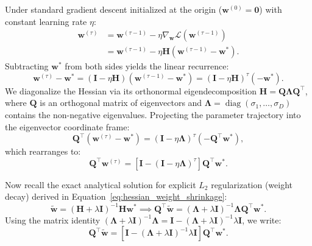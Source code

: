 Under standard gradient descent initialized at the origin ($\mathbf{w}^{(0)} = \mathbf{0}$) with constant learning rate $\eta$:
\begin{align}
\mathbf{w}^{(\tau)} &= \mathbf{w}^{(\tau-1)} - \eta \nabla_{\mathbf{w}} \mathcal{L}(\mathbf{w}^{(\tau-1)}) \nonumber \\
&= \mathbf{w}^{(\tau-1)} - \eta \mathbf{H} (\mathbf{w}^{(\tau-1)} - \mathbf{w}^*).
\end{align}
Subtracting $\mathbf{w}^*$ from both sides yields the linear recurrence:
\begin{equation}
\mathbf{w}^{(\tau)} - \mathbf{w}^* = (\mathbf{I} - \eta \mathbf{H}) (\mathbf{w}^{(\tau-1)} - \mathbf{w}^*) = (\mathbf{I} - \eta \mathbf{H})^\tau (-\mathbf{w}^*).
\label{eq:grad_descent_recurrence_hessian}
\end{equation}
We diagonalize the Hessian via its orthonormal eigendecomposition $\mathbf{H} = \mathbf{Q} \boldsymbol{\Lambda} \mathbf{Q}^\top$, where $\mathbf{Q}$ is an orthogonal matrix of eigenvectors and $\boldsymbol{\Lambda} = \operatorname{diag}(\sigma_1, \dots, \sigma_D)$ contains the non-negative eigenvalues. Projecting the parameter trajectory into the eigenvector coordinate frame:
\begin{equation}
\mathbf{Q}^\top (\mathbf{w}^{(\tau)} - \mathbf{w}^*) = (\mathbf{I} - \eta \boldsymbol{\Lambda})^\tau (-\mathbf{Q}^\top \mathbf{w}^*),
\end{equation}
which rearranges to:
\begin{equation}
\mathbf{Q}^\top \mathbf{w}^{(\tau)} = \left[ \mathbf{I} - (\mathbf{I} - \eta \boldsymbol{\Lambda})^\tau \right] \mathbf{Q}^\top \mathbf{w}^*.
\label{eq:early_stopping_trajectory_eigen}
\end{equation}

Now recall the exact analytical solution for explicit $L_2$ regularization (weight decay) derived in Equation~\eqref{eq:hessian_weight_shrinkage}:
\begin{equation}
\tilde{\mathbf{w}} = (\mathbf{H} + \lambda \mathbf{I})^{-1} \mathbf{H} \mathbf{w}^* \implies \mathbf{Q}^\top \tilde{\mathbf{w}} = (\boldsymbol{\Lambda} + \lambda \mathbf{I})^{-1} \boldsymbol{\Lambda} \mathbf{Q}^\top \mathbf{w}^*.
\end{equation}
Using the matrix identity $(\boldsymbol{\Lambda} + \lambda \mathbf{I})^{-1} \boldsymbol{\Lambda} = \mathbf{I} - (\boldsymbol{\Lambda} + \lambda \mathbf{I})^{-1} \lambda \mathbf{I}$, we write:
\begin{equation}
\mathbf{Q}^\top \tilde{\mathbf{w}} = \left[ \mathbf{I} - (\boldsymbol{\Lambda} + \lambda \mathbf{I})^{-1} \lambda \mathbf{I} \right] \mathbf{Q}^\top \mathbf{w}^*.
\label{eq:l2_solution_eigen}
\end{equation}

